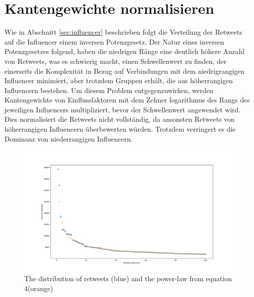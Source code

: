 \section{Kantengewichte normalisieren}
Wie in Abschnitt \ref{sec:influencer} beschrieben folgt die Verteilung der Retweets auf die Influencer einem inversen Potenzgesetz.
Der Natur eines inversen Potenzgesetzes folgend, haben die niedrigen Ränge eine deutlich höhere Anzahl von Retweets, was es schwierig macht, einen Schwellenwert zu finden, der einerseits die Komplexität in Bezug auf Verbindungen mit dem niedrigrangigen Influencer minimiert, aber trotzdem Gruppen erhält, die aus höherrangigen Influencern bestehen.
Um diesem Problem entgegenzuwirken, werden Kantengewichte von Einflussfaktoren mit dem Zehner logarithmus des Rangs des jeweiligen Influencers multipliziert, bevor der Schwellenwert angewendet wird.
Dies normalisiert die Retweets nicht vollständig, da ansonsten Retweets von höherrangigen Influencern überbewerten würden.
Trotzdem verringert es die Dominanz von niederrangigen Influencern.
\begin{figure}[h!]
	\centering
	\includegraphics[width=\linewidth]{images/power-law}
	\caption[]{The distribution of retweets (blue) and the power-law from equation 4(orange)}
	\label{fig:power-law}
\end{figure}
